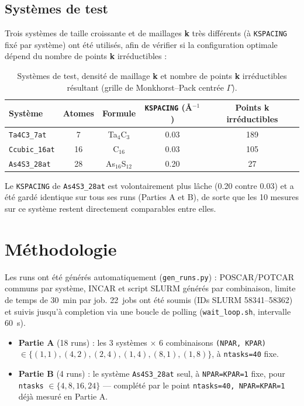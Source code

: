 \documentclass[11pt,a4paper]{article}
\begin{document}
\subsection{Systèmes de test}

Trois systèmes de taille croissante et de maillages \textbf{k} très différents (à
\texttt{KSPACING} fixé par système) ont été utilisés, afin de vérifier si la configuration
optimale dépend du nombre de points \textbf{k} irréductibles :

\begin{table}[h]
\centering
\begin{tabular}{lcccc}
\toprule
Système & Atomes & Formule & \texttt{KSPACING} (\AA$^{-1}$) & Points \textbf{k} irréductibles \\
\midrule
\texttt{Ta4C3\_7at}   & 7  & Ta$_4$C$_3$   & 0.03 & 189 \\
\texttt{Ccubic\_16at} & 16 & C$_{16}$      & 0.03 & 105 \\
\texttt{As4S3\_28at}  & 28 & As$_{16}$S$_{12}$ & 0.20 & 27 \\
\bottomrule
\end{tabular}
\caption{Systèmes de test, densité de maillage \textbf{k} et nombre de points \textbf{k}
irréductibles résultant (grille de Monkhorst--Pack centrée $\Gamma$).}
\end{table}

Le \texttt{KSPACING} de \texttt{As4S3\_28at} est volontairement plus lâche (0.20 contre 0.03) et a
été gardé identique sur tous ses runs (Parties A et B), de sorte que les 10 mesures sur ce système
restent directement comparables entre elles.

\section{Méthodologie}

Les runs ont été générés automatiquement (\texttt{gen\_runs.py}) : POSCAR/POTCAR communs par
système, INCAR et script SLURM générés par combinaison, limite de temps de 30~min par job.
22~jobs ont été soumis (IDs SLURM 58341--58362) et suivis jusqu'à completion via une boucle de
polling (\texttt{wait\_loop.sh}, intervalle 60~s).

\begin{itemize}
  \item \textbf{Partie A} (18 runs) : les 3 systèmes $\times$ 6 combinaisons
  \texttt{(NPAR, KPAR)} $\in \{(1,1),(4,2),(2,4),(1,4),(8,1),(1,8)\}$, à \texttt{ntasks=40} fixe.
  \item \textbf{Partie B} (4 runs) : le système \texttt{As4S3\_28at} seul, à
  \texttt{NPAR=KPAR=1} fixe, pour \texttt{ntasks} $\in \{4,8,16,24\}$ — complété par le point
  \texttt{ntasks=40, NPAR=KPAR=1} déjà mesuré en Partie A.
\end{itemize}
\end{document}

